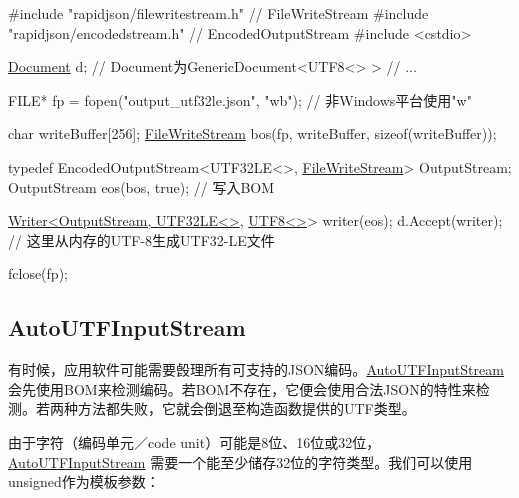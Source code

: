 \begin{DoxyCode}
\textcolor{preprocessor}{#include "rapidjson/filewritestream.h"}  \textcolor{comment}{// FileWriteStream}
\textcolor{preprocessor}{#include "rapidjson/encodedstream.h"}    \textcolor{comment}{// EncodedOutputStream}
\textcolor{preprocessor}{#include <cstdio>}

\hyperlink{class_generic_document}{Document} d;         \textcolor{comment}{// Document为GenericDocument<UTF8<> > }
\textcolor{comment}{// ...}

FILE* fp = fopen(\textcolor{stringliteral}{"output\_utf32le.json"}, \textcolor{stringliteral}{"wb"}); \textcolor{comment}{// 非Windows平台使用"w"}

\textcolor{keywordtype}{char} writeBuffer[256];
\hyperlink{class_file_write_stream}{FileWriteStream} bos(fp, writeBuffer, \textcolor{keyword}{sizeof}(writeBuffer));

\textcolor{keyword}{typedef} EncodedOutputStream<UTF32LE<>, \hyperlink{class_file_write_stream}{FileWriteStream}> OutputStream;
OutputStream eos(bos, \textcolor{keyword}{true});   \textcolor{comment}{// 写入BOM}

\hyperlink{class_writer}{Writer<OutputStream, UTF32LE<>}, \hyperlink{struct_u_t_f8}{UTF8<>}> writer(eos);
d.Accept(writer);   \textcolor{comment}{// 这里从内存的UTF-8生成UTF32-LE文件}

fclose(fp);
\end{DoxyCode}
\hypertarget{md_Commun_Externe_RapidJSON_doc_stream.zh-cn_AutoUTFInputStream}{}\subsection{Auto\+U\+T\+F\+Input\+Stream}\label{md_Commun_Externe_RapidJSON_doc_stream.zh-cn_AutoUTFInputStream}
有时候，应用软件可能需要㲃理所有可支持的\+J\+S\+O\+N编码。{\ttfamily \hyperlink{class_auto_u_t_f_input_stream}{Auto\+U\+T\+F\+Input\+Stream}}会先使用\+B\+O\+M来检测编码。若\+B\+O\+M不存在，它便会使用合法\+J\+S\+O\+N的特性来检测。若两种方法都失败，它就会倒退至构造函数提供的\+U\+T\+F类型。

由于字符（编码单元／code unit）可能是8位、16位或32位，{\ttfamily \hyperlink{class_auto_u_t_f_input_stream}{Auto\+U\+T\+F\+Input\+Stream}} 需要一个能至少储存32位的字符类型。我们可以使用{\ttfamily unsigned}作为模板参数：


